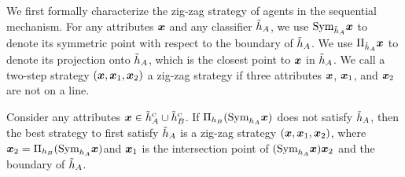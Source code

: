 We first formally characterize the zig-zag strategy of agents in the sequential mechanism. For any attributes $\boldsymbol{x}$ and any classifier $\tilde {h}_A$, we use $\boldsymbol{\text{Sym}}_{\tilde{h}_A} \boldsymbol{x}$ to denote its symmetric point with respect to the boundary of $\tilde{h}_A$. We use $\Pi_{\tilde{h}_A}\boldsymbol{x}$ to denote its projection onto $\tilde{h}_A$, which is the closest point to $\boldsymbol{x}$ in $\tilde {h}_A$. We call a two-step strategy $(\boldsymbol{x},\boldsymbol{x}_1,\boldsymbol{x}_2)$ a zig-zag strategy if three attributes $\boldsymbol{x}$, $\boldsymbol{x}_1$, and $\boldsymbol{x}_2$ are not on a line. 

\begin{lemma}\label{lem:zig-zag}
    Consider any attributes $\boldsymbol{x} \in \tilde {h}_A^{\textsc{c}} \cup \tilde {h}_B^{\textsc{c}}$.  
    If  $\Pi_{h_B}(\boldsymbol{\text{Sym}}_{h_A}\boldsymbol{x})$ does not satisfy $\tilde{h}_A$, then the best strategy to first satisfy $\tilde{h}_A$ is a zig-zag strategy $(\boldsymbol{x},\boldsymbol{x}_1, \boldsymbol{x}_2)$, where $\boldsymbol{x}_2 = \Pi_{h_B}(\boldsymbol{\text{Sym}}_{h_A}\boldsymbol{x})$and $\boldsymbol{x}_1$ is the intersection point of $(\boldsymbol{\text{Sym}}_{h_A}\boldsymbol{x})\boldsymbol{x}_2$ and the boundary of $\tilde{h}_A$.
\end{lemma}

